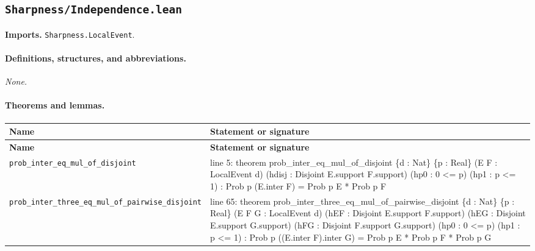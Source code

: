 \documentclass[10pt]{article}
\newcommand{\module}[1]{\texttt{#1}}
\begin{document}
\subsection*{\module{Sharpness/Independence.lean}}
\textbf{Imports.} \module{Sharpness.LocalEvent}.
\paragraph{Definitions, structures, and abbreviations.}
\emph{None.}

\paragraph{Theorems and lemmas.}
\begin{longtable}{>{\raggedright\arraybackslash}p{} >{\raggedright\arraybackslash}p{}}
\textbf{Name} & \textbf{Statement or signature} \\
\hline
\endfirsthead
\textbf{Name} & \textbf{Statement or signature} \\
\hline
\endhead
\texttt{prob\_\allowbreak{}inter\_\allowbreak{}eq\_\allowbreak{}mul\_\allowbreak{}of\_\allowbreak{}disjoint} & {\ttfamily\scriptsize line 5:\allowbreak{} theorem prob\_\allowbreak{}inter\_\allowbreak{}eq\_\allowbreak{}mul\_\allowbreak{}of\_\allowbreak{}disjoint \{d :\allowbreak{} Nat\} \{p :\allowbreak{} Real\} (\allowbreak{}E F :\allowbreak{} LocalEvent d)\allowbreak{} (\allowbreak{}hdisj :\allowbreak{} Disjoint E.\allowbreak{}support F.\allowbreak{}support)\allowbreak{} (\allowbreak{}hp0 :\allowbreak{} 0 <=\allowbreak{} p)\allowbreak{} (\allowbreak{}hp1 :\allowbreak{} p <=\allowbreak{} 1)\allowbreak{} :\allowbreak{} Prob p (\allowbreak{}E.\allowbreak{}inter F)\allowbreak{} =\allowbreak{} Prob p E *\allowbreak{} Prob p F} \\[0.45em]
\texttt{prob\_\allowbreak{}inter\_\allowbreak{}three\_\allowbreak{}eq\_\allowbreak{}mul\_\allowbreak{}of\_\allowbreak{}pairwise\_\allowbreak{}disjoint} & {\ttfamily\scriptsize line 65:\allowbreak{} theorem prob\_\allowbreak{}inter\_\allowbreak{}three\_\allowbreak{}eq\_\allowbreak{}mul\_\allowbreak{}of\_\allowbreak{}pairwise\_\allowbreak{}disjoint \{d :\allowbreak{} Nat\} \{p :\allowbreak{} Real\} (\allowbreak{}E F G :\allowbreak{} LocalEvent d)\allowbreak{} (\allowbreak{}hEF :\allowbreak{} Disjoint E.\allowbreak{}support F.\allowbreak{}support)\allowbreak{} (\allowbreak{}hEG :\allowbreak{} Disjoint E.\allowbreak{}support G.\allowbreak{}support)\allowbreak{} (\allowbreak{}hFG :\allowbreak{} Disjoint F.\allowbreak{}support G.\allowbreak{}support)\allowbreak{} (\allowbreak{}hp0 :\allowbreak{} 0 <=\allowbreak{} p)\allowbreak{} (\allowbreak{}hp1 :\allowbreak{} p <=\allowbreak{} 1)\allowbreak{} :\allowbreak{} Prob p (\allowbreak{}(\allowbreak{}E.\allowbreak{}inter F)\allowbreak{}.\allowbreak{}inter G)\allowbreak{} =\allowbreak{} Prob p E *\allowbreak{} Prob p F *\allowbreak{} Prob p G} \\[0.45em]
\end{longtable}
\end{document}
